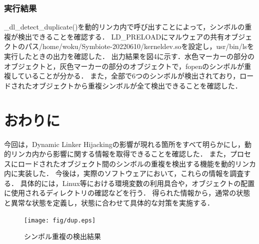 \documentclass[submit,techreq,noauthor]{eco}	%
\begin{document}
\subsubsection{実行結果}
\_dl\_detect\_duplicate()を動的リンカ内で呼び出すことによって，シンボルの重複が検出できることを確認する．
LD\_PRELOADにマルウェアの共有オブジェクトのパス/home/woku/Symbiote-20220610/kerneldev.soを設定し，usr/bin/lsを実行したときの出力を確認した．
出力結果を図4に示す．水色マーカーの部分のオブジェクトと，灰色マーカーの部分のオブジェクトで，fopenのシンボルが重複していることが分かる．
また，全部で6つのシンボルが検出されており，ロードされたオブジェクトから重複シンボルが全て検出できることを確認した．\\


\section{おわりに}
今回は，Dynamic Linker Hijackingの影響が現れる箇所をすべて明らかにし，動的リンカ内から影響に関する情報を取得できることを確認した．
また，プロセスにロードされたオブジェクト間のシンボルの重複を検出する機能を動的リンカ内に実装した．
今後は，実際のソフトウェアにおいて，これらの情報を調査する．
具体的には，Linux等における環境変数の利用具合や，オブジェクトの配置に使用されるディレクトリの確認などを行う．
得られた情報から，通常の状態と異常な状態を定義し，状態に合わせて具体的な対策を実施する．


\begin{figure}[t]
	\centering
  \texttt{[image: fig/dup.eps]}
	\caption{シンボル重複の検出結果}
	\label{fig:duplicate}
\end{figure}



\setlength\baselineskip{12pt}
{\small
	
	
}
\end{document}
